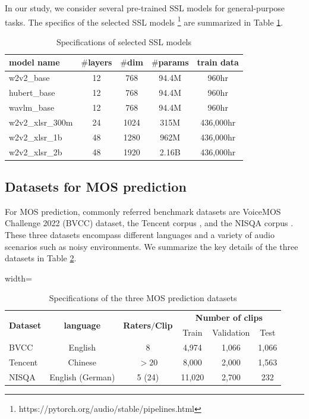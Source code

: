 \documentclass[conference]{IEEEtran}
\begin{document}
In our study, we consider several pre-trained SSL models for general-purpose tasks. The specifics of the selected SSL models \footnote{https://pytorch.org/audio/stable/pipelines.html} are summarized in Table \ref{tab:ssl_models}.

\begin{table}[h!]
\small
\centering
\begin{tabular}{l|cccc}
\hline
\textbf{model name}        & \textbf{$\#$layers} & \textbf{$\#$dim} & \textbf{$\#$params} & \textbf{train data}          \\ \hline
w2v2\_base          & 12   & 768  & 94.4M   & 960hr      \\
hubert\_base        & 12   & 768  & 94.4M   & 960hr      \\ 
wavlm\_base         & 12   & 768  & 94.4M   & 960hr      \\
w2v2\_xlsr\_300m    & 24   & 1024 & 315M    & 436,000hr  \\
w2v2\_xlsr\_1b      & 48   & 1280 & 962M    & 436,000hr  \\
w2v2\_xlsr\_2b      & 48   & 1920 & 2.16B   & 436,000hr  \\ \hline
\end{tabular}
\caption{Specifications of selected SSL models}
\label{tab:ssl_models}
\end{table}

\subsection{Datasets for MOS prediction}

For MOS prediction, commonly referred benchmark datasets are VoiceMOS Challenge 2022 (BVCC) \cite{BVCC} dataset, the Tencent corpus \cite{Tencent}, and the NISQA corpus \cite{NISQA}. These three datasets encompass different languages and a variety of audio scenarios such as noisy environments. We summarize the key details of the three datasets in Table \ref{tab:datasets}.

\begin{table}[h!]
\centering
\begin{adjustbox}{width=\columnwidth}
\begin{tabular}{l|ccccc}
\hline
\multirow{2}{*}{\textbf{Dataset}} & \multirow{2}{*}{\textbf{language}} & \multirow{2}{*}{\textbf{Raters$/$Clip}} & \multicolumn{3}{c}{\textbf{Number of clips}} \\
& & & Train & Validation & Test \\ \hline
BVCC & English & 8 & 4,974 & 1,066 & 1,066 \\
Tencent & Chinese & $>20$ & 8,000 & 2,000 & 1,563 \\
NISQA & English (German) & 5 (24) & 11,020 & 2,700 & 232 \\ \hline
\end{tabular}
\end{adjustbox}
\caption{Specifications of the three MOS prediction datasets}
\label{tab:datasets}
\end{table}
\end{document}
